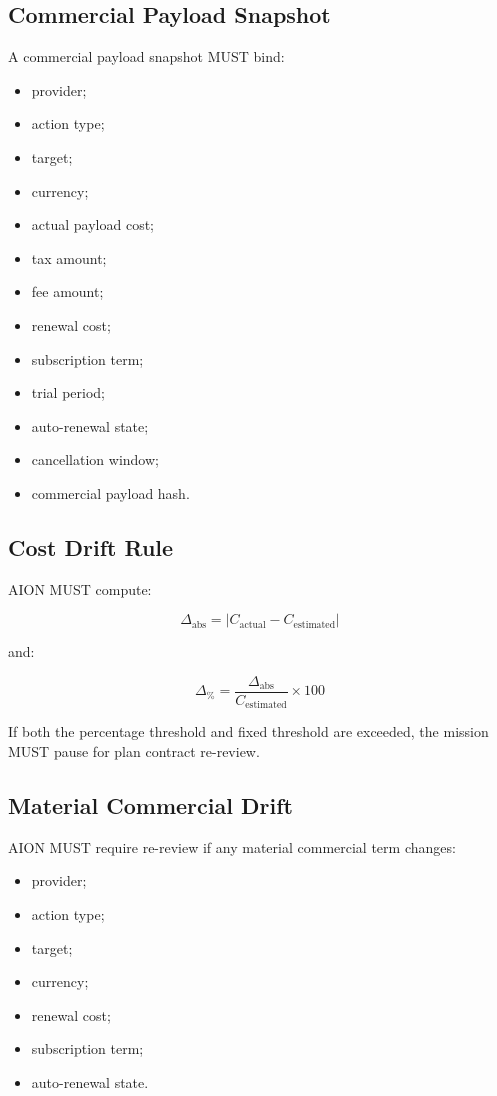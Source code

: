 \subsection{Commercial Payload Snapshot}

A commercial payload snapshot MUST bind:

\begin{itemize}
  \item provider;
  \item action type;
  \item target;
  \item currency;
  \item actual payload cost;
  \item tax amount;
  \item fee amount;
  \item renewal cost;
  \item subscription term;
  \item trial period;
  \item auto-renewal state;
  \item cancellation window;
  \item commercial payload hash.
\end{itemize}

\subsection{Cost Drift Rule}

AION MUST compute:

\begin{equation}
\Delta_{\mathrm{abs}} = |C_{\mathrm{actual}} - C_{\mathrm{estimated}}|
\end{equation}

and:

\begin{equation}
\Delta_{\%} =
\frac{\Delta_{\mathrm{abs}}}{C_{\mathrm{estimated}}}
\times 100
\end{equation}

If both the percentage threshold and fixed threshold are exceeded, the mission MUST pause for plan contract re-review.

\subsection{Material Commercial Drift}

AION MUST require re-review if any material commercial term changes:

\begin{itemize}
  \item provider;
  \item action type;
  \item target;
  \item currency;
  \item renewal cost;
  \item subscription term;
  \item auto-renewal state.
\end{itemize}

